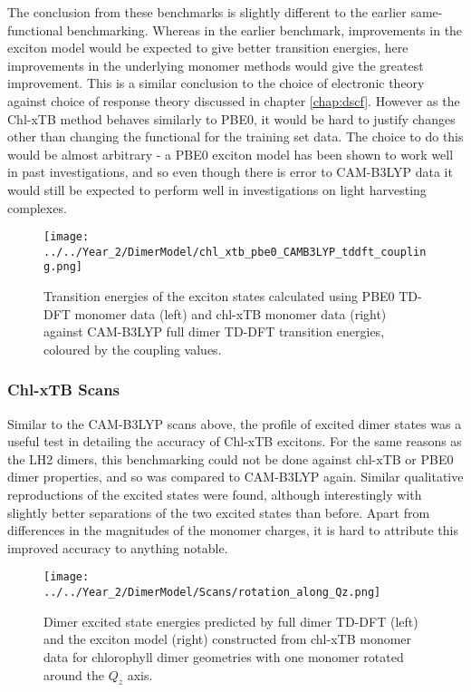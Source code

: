 The conclusion from these benchmarks is slightly different to the earlier same-functional
benchmarking. Whereas in the earlier benchmark, improvements in the exciton model
would be expected to give better transition energies, here improvements in the underlying
monomer methods would give the greatest improvement. This is a similar conclusion
to the choice of electronic theory against choice of response theory discussed in
chapter \ref{chap:dscf}. However as the Chl-xTB method behaves similarly to PBE0,
it would be hard to justify changes other than changing the functional for the training 
set data. The choice to do this would be almost arbitrary - a PBE0 exciton model has
been shown to work well in past investigations, and so even though there is error
to CAM-B3LYP data it would still be expected to perform well in investigations on 
light harvesting complexes.

\begin{figure}
    \centering
    \texttt{[image: ../../Year\_2/DimerModel/chl\_xtb\_pbe0\_CAMB3LYP\_tddft\_coupling.png]}
    \caption{Transition energies of the exciton states calculated using PBE0 TD-DFT
    monomer data (left) and chl-xTB monomer data (right) against CAM-B3LYP full
    dimer TD-DFT transition energies, coloured by the coupling values.}
    \label{fig:chl_xtb_pbe0_LH2}
\end{figure}

\subsubsection{Chl-xTB Scans}
\label{subsubsec:chl_xtb_scans}

Similar to the CAM-B3LYP scans above, the profile of excited dimer states was a useful
test in detailing the accuracy of Chl-xTB excitons. For the same reasons as the
LH2 dimers, this benchmarking could not be done against chl-xTB or PBE0 dimer properties,
and so was compared to CAM-B3LYP again. Similar qualitative reproductions of the
excited states were found, although interestingly with slightly better separations
of the two excited states than before. Apart from differences in the magnitudes 
of the monomer charges, it is hard to attribute this improved accuracy to anything
notable.

\begin{figure}
    \centering
    \texttt{[image: ../../Year\_2/DimerModel/Scans/rotation\_along\_Qz.png]}
    \caption{Dimer excited state energies predicted by full dimer TD-DFT (left)
    and the exciton model (right) constructed from chl-xTB monomer data for chlorophyll 
    dimer geometries with one monomer rotated around the $Q_z$ axis.}
    \label{fig:chl_xtb_rot_Qz}
\end{figure}

